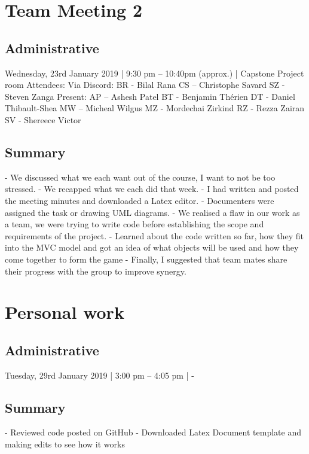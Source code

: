 \documentclass[12pt]{article}
\begin{document}
 



\pagebreak

\section{Team Meeting 2 }

\subsection{Administrative}
Wednesday, 23rd January 2019 | 9:30 pm – 10:40pm (approx.) | Capstone Project room 
Attendees: 
Via Discord: 
BR - Bilal Rana
CS – Christophe Savard 
SZ - Steven Zanga
Present: 
AP – Ashesh Patel
BT - Benjamin Thérien
DT - Daniel Thibault-Shea
MW – Micheal Wilgus
MZ - Mordechai Zirkind  
RZ - Rezza Zairan 
SV - Shereece Victor 




\subsection{Summary}
-	We discussed what we each want out of the course, I want to not be too stressed. 
-	We recapped what we each did that week. 
-	I had written and posted the meeting minutes and downloaded a Latex editor. 
-	Documenters were assigned the task or drawing UML diagrams.
-	We realised a flaw in our work as a team, we were trying to write code before establishing the scope and requirements of the project. 
-	Learned about the code written so far, how they fit into the MVC model and got an idea of what objects will be used and how they come together to form the game 
-	Finally, I suggested that team mates share their progress with the group to improve synergy. 




\pagebreak

\section{Personal work }

\subsection{Administrative}
Tuesday, 29rd January 2019 | 3:00 pm – 4:05 pm | -



\subsection{Summary}
-	Reviewed code posted on GitHub
-	Downloaded Latex Document template and making edits to see how it works   
\end{document}
